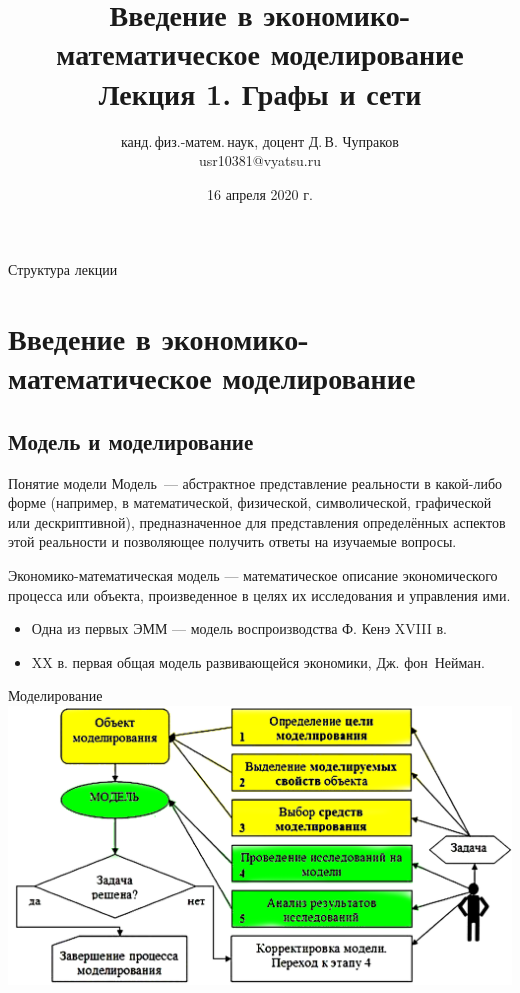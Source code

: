 \documentclass[unicode,11pt,notheorems]{beamer}
\author[Д.\,В. Чупраков]{канд.\,физ.-матем.\,наук, доцент Д.\,В. Чупраков\\[6pt] usr10381@vyatsu.ru}
\institute[ВятГУ]{ФГБОУ ВО Вятский государственный университет}
\title[Графы и сети]{
	Введение в экономико-математическое моделирование\\[12pt]
	Лекция 1. Графы и сети}
\date{16 апреля 2020 г.}
\begin{document}
\maketitle

\begin{frame}{Структура лекции}
	\tableofcontents
\end{frame}

\section{Введение в экономико-математическое моделирование}
\subsection{Модель и моделирование}
\begin{frame}{Понятие модели}
	\alert{Модель}~--- абстрактное представление реальности в какой-либо форме (например, в математической, физической, символической, графической или дескриптивной), предназначенное для представления определённых аспектов этой реальности и позволяющее получить ответы на изучаемые вопросы.

	\begin{block}{}
		\alert{Экономико-математическая модель} --- математическое описание экономического процесса или объекта, произведенное в целях их исследования и управления ими.
	\end{block}


	\begin{itemize}
	\item
		Одна из первых ЭММ --- модель воспроизводства Ф. Кенэ XVIII в. 
	\item 
	 XX в. первая общая модель развивающейся экономики, Дж. фон~Нейман. 
	\end{itemize}
\end{frame}

\begin{frame}{Моделирование}
	\centering
	\includegraphics[width=\textwidth]{modeling.png}
\end{frame}
\end{document}
